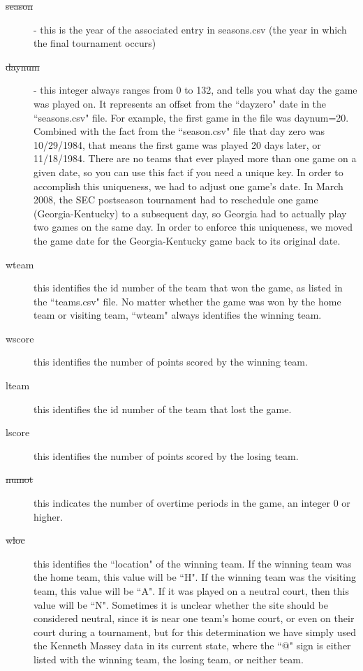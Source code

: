 \documentclass{article} %
\begin{document}
\label{sec:data-winner-features-compact}

\begin{description}
\item[\sout{season}] - this is the year of the associated entry in seasons.csv (the year in which the final tournament occurs)
\item[\sout{daynum}] - this integer always ranges from 0 to 132, and tells you what day the game was played on. It represents an offset from the ``dayzero" date in the ``seasons.csv" file. For example, the first game in the file was daynum=20. Combined with the fact from the ``season.csv" file that day zero was 10/29/1984, that means the first game was played 20 days later, or 11/18/1984. There are no teams that ever played more than one game on a given date, so you can use this fact if you need a unique key. In order to accomplish this uniqueness, we had to adjust one game's date. In March 2008, the SEC postseason tournament had to reschedule one game (Georgia-Kentucky) to a subsequent day, so Georgia had to actually play two games on the same day. In order to enforce this uniqueness, we moved the game date for the Georgia-Kentucky game back to its original date.
\item[wteam] this identifies the id number of the team that won the game, as listed in the ``teams.csv" file. No matter whether the game was won by the home team or visiting team, ``wteam" always identifies the winning team.
\item[wscore] this identifies the number of points scored by the winning team.
\item[lteam] this identifies the id number of the team that lost the game.
\item[lscore] this identifies the number of points scored by the losing team.
\item[\sout{numot}] this indicates the number of overtime periods in the game, an integer 0 or higher.
\item[\sout{wloc}] this identifies the ``location" of the winning team. If the winning team was the home team, this value will be ``H". If the winning team was the visiting team, this value will be ``A". If it was played on a neutral court, then this value will be ``N". Sometimes it is unclear whether the site should be considered neutral, since it is near one team's home court, or even on their court during a tournament, but for this determination we have simply used the Kenneth Massey data in its current state, where the ``@" sign is either listed with the winning team, the losing team, or neither team.
\end{description}
\end{document}
